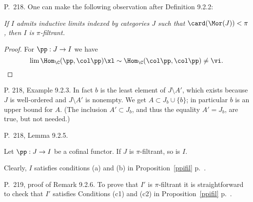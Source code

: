 \documentclass[12pt]{article}
\theoremstyle{remark}
\theoremstyle{definition}
\begin{document}
%

\begin{s}
P.~218. One can make the following observation after Definition 9.2.2: 

\emph{If $I$ admits inductive limits indexed by categories $J$ such that $\card(\Mor(J))<\pi$, then $I$ is $\pi$-filtrant.} 

\begin{proof}
For $\pp:J\to I$ we have
$$
\lim\Hom_\C(\pp,\col\pp)\xl\sim\Hom_\C(\col\pp,\col\pp)\neq\vi.
$$
\end{proof}
\end{s}

%

\begin{s}
P. 218, Example 9.2.3. In fact $b$ is the least element of $J\setminus A'$, which exists because $J$ is well-ordered and $J\setminus A'$ is nonempty. We get $A\subset J_b\cup\{b\}$; in particular $b$ is an upper bound for $A$. (The inclusion $A'\subset J_b$, and thus the equality $A'=J_b$, are true, but not needed.)
\end{s}

%

\begin{s}
P.~218, Lemma 9.2.5. 

\begin{lem}[Lemma 9.2.5 p.~218] 
Let $\pp:J\to I$ be a cofinal functor. If $J$ is $\pi$-filtrant, so is $I$.
\end{lem}

Clearly, $I$ satisfies conditions (a) and (b) in Proposition~\ref{ppifil} p.~. 
\end{s}

%

\begin{s}
P.~219, proof of Remark 9.2.6. To prove that $I'$ is $\pi$-filtrant it is straightforward to check that $I'$ satisfies Conditions (c1) and (c2) in Proposition~\ref{ppifil} p.~.
\end{s} 

%
\end{document}
